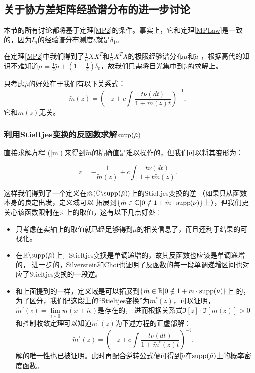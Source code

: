 \documentclass[UTF8,12pt]{ctexart}
\begin{document}
\subsection{关于协方差矩阵经验谱分布的进一步讨论}
本节的所有讨论都将基于定理\ref{MP2}的条件。事实上，它和定理\ref{MPLaw}是一致的，因为$I_n$的经验谱分布测度$\nu$就是$\delta_1$。

在定理\ref{MP2}中我们得到了$\frac{1}{n}XX^T$和$\frac{1}{n}X^T X$的极限经验谱分布$\mu$和$\tilde \mu$
，根据高代的知识不难知道$\mu = \frac{1}{c}\tilde\mu + (1-\frac{1}{c})\delta_0$，故我们只需将目光集中到$\tilde\mu$的求解上。

只考虑$\tilde \mu$的好处在于我们有以下关系式：
\begin{equation}\label{m}
    \tilde m(z) = {(
        -z + c\int\frac{t \nu (dt)}{1+\tilde m (z)t}
    )}^{-1},
\end{equation}
它和$m(z)$无关。

\subsubsection{利用Stieltjes变换的反函数求解$\textup{supp}(\tilde\mu)$}

直接求解方程 (\ref{m}) 来得到$\tilde m$的精确值是难以操作的，但我们可以将其变形为：

\begin{equation}\label{inverse}
    z = -\frac{1}{\tilde m(z)} + c \int \frac{t \nu (dt)}{1+t\tilde m(z)}.
\end{equation}

这样我们得到了一个定义在$\tilde m (\mathbb C \backslash \textup{supp}(\tilde \mu))$上的Stieltjes变换的逆
（如果只从函数本身的良定出发，定义域可以
拓展到$\{\tilde m \in \mathbb C | 0 \notin 1 + \tilde m \cdot \textup{supp}(\nu)\}$上），但我们更关心该函数限制在$\mathbb R$
上的取值，这有以下几点好处：

\begin{itemize}
    \item 只考虑在实轴上的取值就已经足够得到$\tilde\mu$的相关信息了，而且还利于结果的可视化。
    \item 在$\mathbb R \backslash \textup{supp}(\tilde\mu)$上，Stieltjes变换是单调递增的，故其反函数也应该是单调递增的，
    进一步的，Silverstein和Choi也证明了反函数的每一段单调递增区间也对应了Stieltjes变换的一段逆。
    \item 和上面提到的一样，定义域是可以拓展到$\{\tilde m \in \mathbb R | 0 \notin 1 + \tilde m \cdot \textup{supp}(\nu)\}$上
    的，为了区分，我们记这段上的“Stieltjes变换”为$\tilde m ^\circ (z)$，可以证明，$\tilde m ^\circ (z) = \lim\limits_{\epsilon \downarrow 0}\tilde m (x+i\epsilon)$是存在的，
    进而根据关系式$\Im[z]\cdot\Im[m(z)]>0$和控制收敛定理可以知道$\tilde m ^\circ (z)$为下述方程的正虚部解：
    \[
        \tilde m^\circ(z) = {(
            -z + c\int\frac{t \nu (dt)}{1+\tilde m^\circ (z)t}
        )}^{-1} ,
    \]  
    解的唯一性也已被证明。此时再配合逆转公式便可得到$\tilde \mu$在$\textup{supp}(\tilde \mu)$上的概率密度函数。
\end{itemize}
\end{document}
